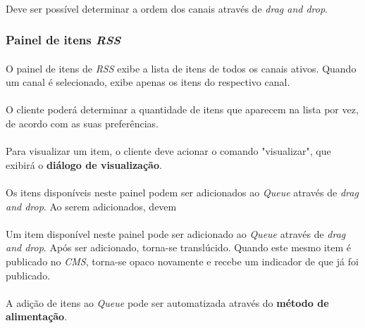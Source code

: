 \documentclass[a4paper,12pt]{article}
\def\cms{\emph{CMS}}
\def\rss{\emph{RSS}}
\def\queue{\emph{Queue}}
\begin{document}
\paragraph{}
Deve ser possível determinar a ordem dos canais através de \emph{drag and
drop}.

\subsubsection{Painel de itens \rss{}}

\paragraph{}
O painel de itens de \rss{} exibe a lista de itens de todos os canais ativos.
Quando um canal é selecionado, exibe apenas os itens do respectivo canal.

\paragraph{}
O cliente poderá determinar a quantidade de itens que aparecem na lista por
vez, de acordo com as suas preferências.

\paragraph{}
Para visualizar um item, o cliente deve acionar o comando "visualizar", que
exibirá o \textbf{diálogo de visualização}.

\paragraph{}
Os itens disponíveis neste painel podem ser adicionados ao \queue{} através de
\emph{drag and drop}. Ao serem adicionados, devem 

\paragraph{}
Um item disponível neste painel pode ser adicionado ao \queue{} através de
\emph{drag and drop}. Após ser adicionado, torna-se translúcido. Quando este
mesmo item é publicado no \cms{}, torna-se opaco novamente e recebe um
indicador de que já foi publicado.

\paragraph{}
A adição de itens ao \queue{} pode ser automatizada através do \textbf{método
de alimentação}.
\end{document}
